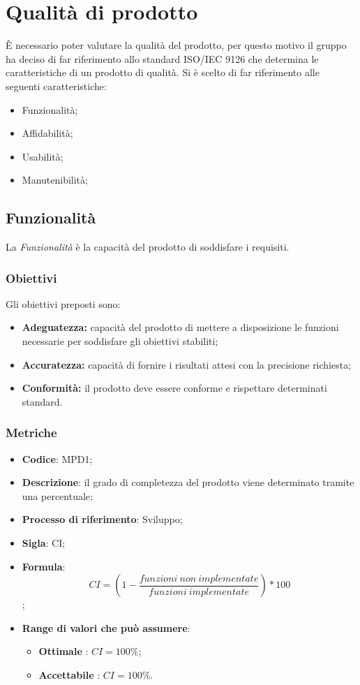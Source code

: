 \section{Qualità di prodotto}
È necessario poter valutare la qualità del prodotto, per questo motivo il gruppo \Omicron{} ha deciso di far riferimento allo standard ISO/IEC 9126 che determina le caratteristiche di un prodotto di qualità. Si è scelto di far riferimento alle seguenti caratteristiche:
\begin {itemize}
	\item{Funzionalità;}
	\item{Affidabilità;}
	\item{Usabilità;}
	\item{Manutenibilità;}
\end{itemize}

\subsection{Funzionalità}
La \textit{Funzionalità} è la capacità del prodotto di soddisfare i requisiti.
\subsubsection{Obiettivi}
Gli obiettivi preposti sono:
\begin {itemize}
	\item \textbf{Adeguatezza:} capacità del prodotto di mettere a disposizione le funzioni necessarie per soddisfare gli obiettivi stabiliti;
	\item \textbf{Accuratezza:} capacità di fornire i risultati attesi con la precisione richiesta;
	\item \textbf{Conformità:} il prodotto deve essere conforme e rispettare determinati standard.
\end{itemize}
\subsubsection{Metriche}
\vspace{-1cm}
\begin{itemize}
	\item \textbf{Codice}: MPD1;
	\item \textbf{Descrizione}: il grado di completezza del prodotto viene determinato tramite una percentuale;
	\item \textbf{Processo di riferimento}: Sviluppo;
	\item \textbf{Sigla}: CI;
	\item \textbf{Formula}: \[CI=\left(1-\frac{funzioni \ non \ implementate}{funzioni \ implementate}\right)\ast100\];
	\item \textbf{Range di valori che può assumere}: 
		\begin{itemize}
			\item \textbf{Ottimale} : $CI = 100 \%$;
			\item \textbf{Accettabile} : $CI = 100 \%$.
		\end{itemize}
\end{itemize}

